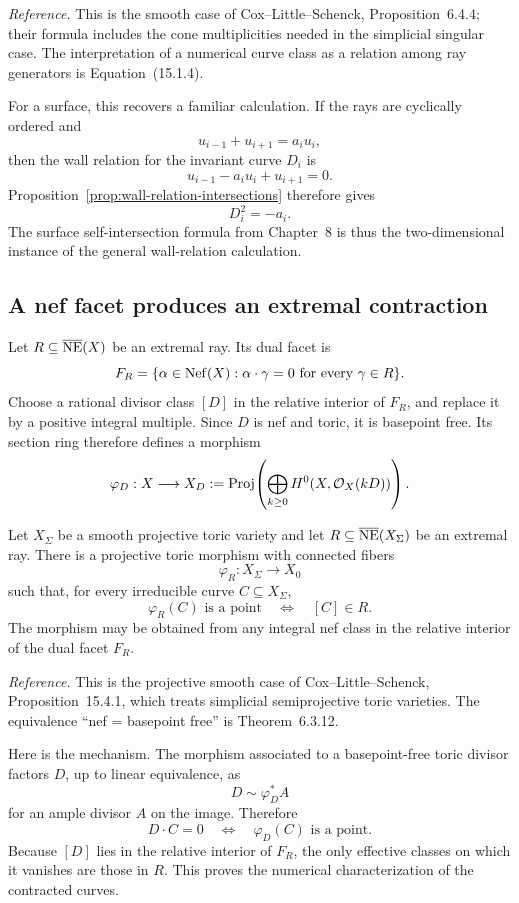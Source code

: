 \noindent
\textit{Reference.}
This is the smooth case of Cox--Little--Schenck,
Proposition~6.4.4; their formula includes the cone multiplicities
needed in the simplicial singular case.  The interpretation of a
numerical curve class as a relation among ray generators is
Equation~(15.1.4).

For a surface, this recovers a familiar calculation.  If the rays are
cyclically ordered and
\[
u_{i-1}+u_{i+1}=a_i u_i,
\]
then the wall relation for the invariant curve \(D_i\) is
\[
u_{i-1}-a_i u_i+u_{i+1}=0.
\]
Proposition~\ref{prop:wall-relation-intersections} therefore gives
\[
D_i^2=-a_i.
\]
The surface self-intersection formula from Chapter~8 is thus the
two-dimensional instance of the general wall-relation calculation.

\subsection{A nef facet produces an extremal contraction}

Let \(R\subseteq\overline{\operatorname{NE}}(X)\) be an extremal ray.  Its dual
facet is
\[
F_R
=
\{\alpha\in\operatorname{Nef}(X):\alpha\cdot\gamma=0
  \text{ for every }\gamma\in R\}.
\]
Choose a rational divisor class \([D]\) in the relative interior of
\(F_R\), and replace it by a positive integral multiple.  Since \(D\)
is nef and toric, it is basepoint free.  Its section ring therefore
defines a morphism
\[
\varphi_D:X
\longrightarrow
X_D
:=
\operatorname{Proj}\!\left(
\bigoplus_{k\geq0}H^0(X,\mathcal O_X(kD))
\right).
\]

\begin{theorem}
\label{thm:toric-extremal-contraction}
Let \(X_\Sigma\) be a smooth projective toric variety and let
\(R\subseteq\overline{\operatorname{NE}}(X_\Sigma)\) be an extremal ray.  There is a
projective toric morphism with connected fibers
\[
\varphi_R:X_\Sigma\longrightarrow X_0
\]
such that, for every irreducible curve \(C\subseteq X_\Sigma\),
\[
\boxed{
\varphi_R(C)\text{ is a point}
\quad\Longleftrightarrow\quad
[C]\in R.}
\]
The morphism may be obtained from any integral nef class in the
relative interior of the dual facet \(F_R\).
\end{theorem}

\noindent
\textit{Reference.}
This is the projective smooth case of Cox--Little--Schenck,
Proposition~15.4.1, which treats simplicial semiprojective toric
varieties.  The equivalence ``nef = basepoint free'' is
Theorem~6.3.12.

Here is the mechanism.  The morphism associated to a basepoint-free
toric divisor factors \(D\), up to linear equivalence, as
\[
D\sim\varphi_D^*A
\]
for an ample divisor \(A\) on the image.  Therefore
\[
D\cdot C=0
\quad\Longleftrightarrow\quad
\varphi_D(C)\text{ is a point}.
\]
Because \([D]\) lies in the relative interior of \(F_R\), the only
effective classes on which it vanishes are those in \(R\).  This proves
the numerical characterization of the contracted curves.

